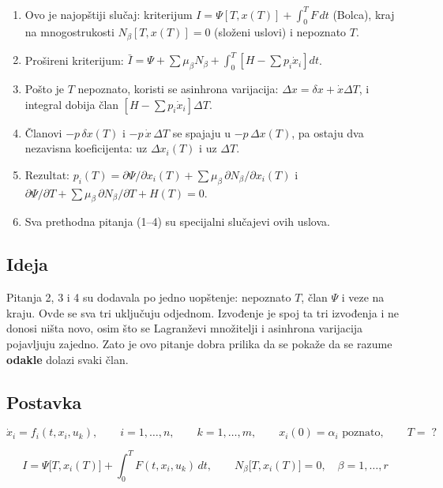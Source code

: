 \documentclass[11pt,a4paper,parskip=half,headsepline,numbers=noenddot]{scrartcl}
\begin{document}
\begin{kljucna}
\begin{enumerate}
\def\labelenumi{\arabic{enumi}.}
\item Ovo je najopštiji slučaj: kriterijum \(I = \Psi[T, x(T)] + \int_0^T F\,dt\) (Bolca), kraj na mnogostrukosti \(N_\beta[T, x(T)] = 0\) (složeni uslovi) i nepoznato \(T\).
\item Prošireni kriterijum: \(\bar I = \Psi + \sum\mu_\beta N_\beta + \int_0^T[H - \sum p_i\dot x_i]dt\).
\item Pošto je \(T\) nepoznato, koristi se asinhrona varijacija: \(\Delta x = \delta x + \dot x\Delta T\), i integral dobija član \([H - \sum p_i\dot x_i]\Delta T\).
\item Članovi \(-p\,\delta x(T)\) i \(-p\,\dot x\,\Delta T\) se spajaju u \(-p\,\Delta x(T)\), pa ostaju dva nezavisna koeficijenta: uz \(\Delta x_i(T)\) i uz \(\Delta T\).
\item Rezultat: \(p_i(T) = \partial\Psi/\partial x_i(T) + \sum\mu_\beta\,\partial N_\beta/\partial x_i(T)\) i \(\partial\Psi/\partial T + \sum\mu_\beta\,\partial N_\beta/\partial T + H(T) = 0\).
\item Sva prethodna pitanja (1--4) su specijalni slučajevi ovih uslova.
\end{enumerate}
\end{kljucna}

\subsection{Ideja}

Pitanja 2, 3 i 4 su dodavala po jedno uopštenje: nepoznato \(T\), član \(\Psi\) i veze na kraju. Ovde se sva tri uključuju odjednom. Izvođenje je spoj ta tri izvođenja i ne donosi ništa novo, osim što se Lagranževi množitelji i asinhrona varijacija pojavljuju zajedno. Zato je ovo pitanje dobra prilika da se pokaže da se razume \textbf{odakle} dolazi svaki član.

\subsection{Postavka}

\[\dot x_i = f_i(t, x_i, u_k), \qquad i = 1, \dots, n, \qquad k = 1, \dots, m, \qquad x_i(0) = \alpha_i \text{ poznato}, \qquad T = \;?\]

\[I = \Psi\big[T, x_i(T)\big] + \int_0^T F(t, x_i, u_k)\,dt, \qquad N_\beta\big[T, x_i(T)\big] = 0, \quad \beta = 1, \dots, r\]
\end{document}
